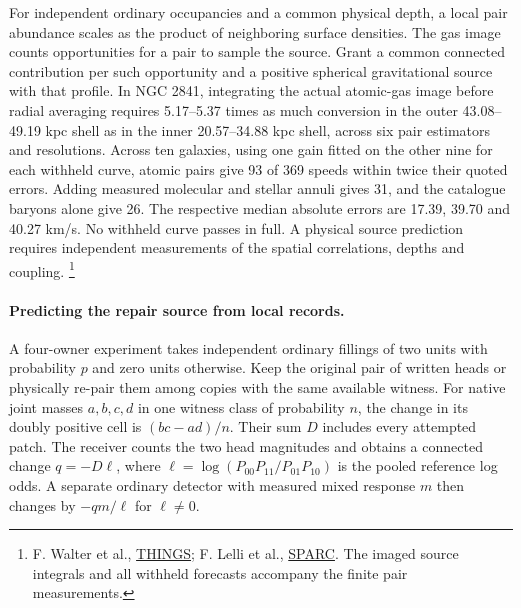 \documentclass[11pt]{article}
\begin{document}
For independent ordinary occupancies and a common physical depth,
a local pair abundance scales as the product of neighboring surface
densities. The gas image counts opportunities for a pair to sample the
source. Grant a common connected contribution per such opportunity and
a positive spherical gravitational source with that profile. In NGC 2841, integrating the actual atomic-gas image before
radial averaging requires 5.17--5.37 times as much conversion in
the outer 43.08--49.19 kpc shell as in the inner 20.57--34.88 kpc
shell, across six pair estimators and resolutions. Across ten galaxies,
using one gain fitted on the other nine for each withheld curve,
atomic pairs give 93 of 369 speeds within twice their quoted errors.
Adding measured molecular and stellar annuli gives 31, and the
catalogue baryons alone give 26. The respective median absolute errors
are 17.39, 39.70 and 40.27 km/s. No withheld curve passes in full.
A physical source prediction requires independent measurements of the
spatial correlations, depths and coupling.%
\footnote{F. Walter et al., \href{https://arxiv.org/abs/0810.2125}{THINGS};
F. Lelli et al., \href{https://astroweb.cwru.edu/SPARC/}{SPARC}.
The imaged source integrals and all withheld forecasts accompany
the finite pair measurements.}

\paragraph{Predicting the repair source from local records.}
A four-owner experiment takes independent ordinary fillings of two
units with probability $p$ and zero units otherwise. Keep the original
pair of written heads or physically re-pair them among copies with
the same available witness. For native joint masses $a,b,c,d$ in
one witness class of probability $n$, the change in its doubly
positive cell is $(bc-ad)/n$. Their sum $D$ includes every attempted
patch. The receiver counts the two head magnitudes and obtains a
connected change $q=-D\ell$, where
$\ell=\log(P_{00}P_{11}/P_{01}P_{10})$ is the pooled reference log
odds. A separate ordinary detector with measured mixed response $m$
then changes by $-qm/\ell$ for $\ell\ne0$.
\end{document}
